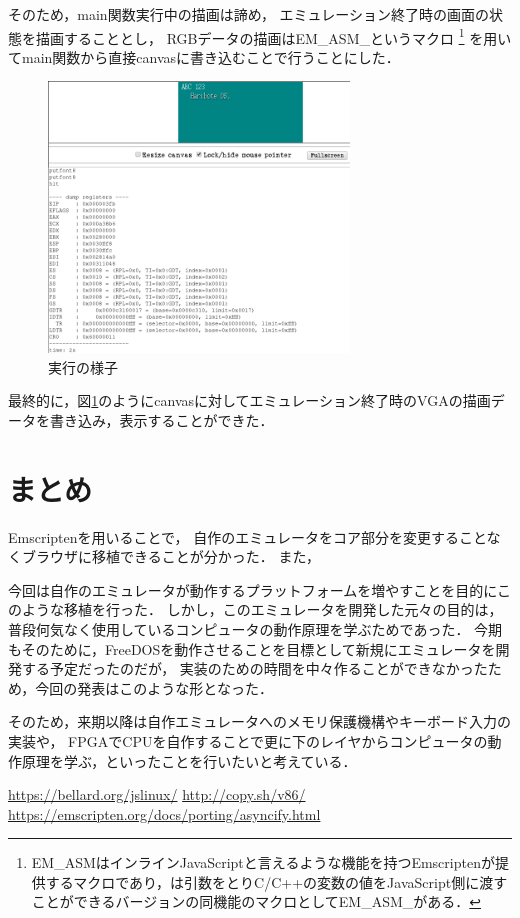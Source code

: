 \documentclass[a4j,10pt]{jsarticle}
\begin{document}
そのため，main関数実行中の描画は諦め，
エミュレーション終了時の画面の状態を描画することとし，
RGBデータの描画はEM\_ASM\_というマクロ
\footnote{EM\_ASMはインラインJavaScriptと言えるような機能を持つEmscriptenが提供するマクロであり，は引数をとりC/C++の変数の値をJavaScript側に渡すことができるバージョンの同機能のマクロとしてEM\_ASM\_がある．}
を用いてmain関数から直接canvasに書き込むことで行うことにした．

\begin{figure}[htbp]
	\begin{center}
		\includegraphics[width=8cm]{./demo.png}
		\caption{実行の様子}
		\label{demo}
	\end{center}
\end{figure}

最終的に，図\ref{demo}のようにcanvasに対してエミュレーション終了時のVGAの描画データを書き込み，表示することができた．

\section{まとめ}
Emscriptenを用いることで，
自作のエミュレータをコア部分を変更することなくブラウザに移植できることが分かった．
また，

今回は自作のエミュレータが動作するプラットフォームを増やすことを目的にこのような移植を行った．
しかし，このエミュレータを開発した元々の目的は，
普段何気なく使用しているコンピュータの動作原理を学ぶためであった．
今期もそのために，FreeDOSを動作させることを目標として新規にエミュレータを開発する予定だったのだが，
実装のための時間を中々作ることができなかったため，今回の発表はこのような形となった．

そのため，来期以降は自作エミュレータへのメモリ保護機構やキーボード入力の実装や，
FPGAでCPUを自作することで更に下のレイヤからコンピュータの動作原理を学ぶ，といったことを行いたいと考えている．

% 
% 

\begin{thebibliography}{99}
		\url{https://bellard.org/jslinux/}
		\url{http://copy.sh/v86/}
		\url{https://emscripten.org/docs/porting/asyncify.html}
\end{thebibliography}
\end{document}
